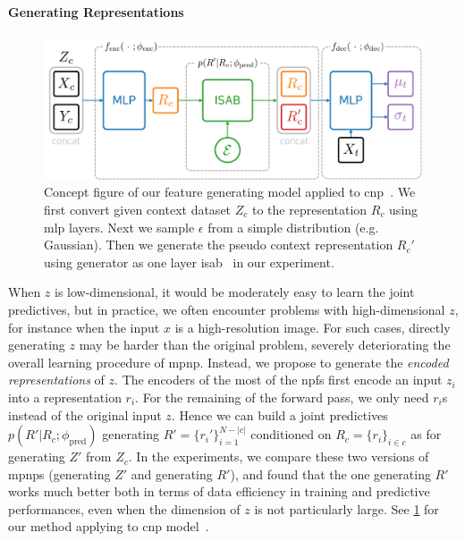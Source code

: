 \paragraph{Generating Representations} 
\begin{figure}[t]
    \centering
    \includegraphics[width=\linewidth]{figure/main_concept.pdf}
    \caption{Concept figure of our feature generating model applied to \gls{cnp}~\citep{garnelo2018conditional}. We first convert given context dataset $Z_c$ to the representation $R_c$ using \gls{mlp} layers. Next we sample $\epsilon$ from a simple distribution (e.g. Gaussian). Then we generate the pseudo context representation $R_c'$ using generator as one layer \gls{isab}~\citep{lee2019set} in our experiment.
    }
    \label{figure/main_concept_mpnp}
\end{figure}
When $z$ is low-dimensional, it would be moderately easy to learn the joint predictives, but in practice, we often encounter problems with high-dimensional $z$, for instance when the input $x$ is a high-resolution image. For such cases, directly generating $z$ may be harder than the original problem, severely deteriorating the overall learning procedure of \gls{mpnp}.
Instead, we propose to generate the \emph{encoded representations} of $z$. The encoders of the most of the \glspl{npf} first encode an input $z_i$ into a representation $r_i$. For the remaining of the forward pass, we only need $r_i$s instead of the original input $z$. Hence we can build a joint predictives $p(R'|R_c; \phi_\text{pred})$ generating $R' = \{r_i'\}_{i=1}^{N-|c|}$ conditioned on $R_c = \{r_i\}_{i\in c}$ as for generating $Z'$ from $Z_c$. In the experiments, we compare these two versions of \glspl{mpnp} (generating $Z'$ and generating $R'$), and found that the one generating $R'$ works much better both in terms of data efficiency in training and predictive performances, even when the dimension of $z$ is not particularly large.
See \cref{figure/main_concept_mpnp} for our method applying to \gls{cnp} model~\citep{garnelo2018conditional}.

